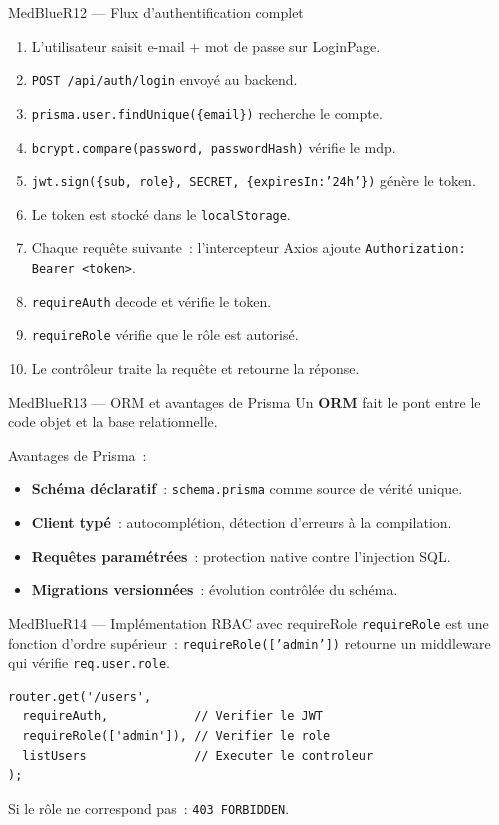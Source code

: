 \documentclass[12pt,a4paper,oneside]{report}
\begin{document}
\begin{qbox}{MedBlue}{R12 --- Flux d'authentification complet}
\begin{enumerate}
  \item L'utilisateur saisit e-mail + mot de passe sur LoginPage.
  \item \texttt{POST /api/auth/login} envoyé au backend.
  \item \texttt{prisma.user.findUnique(\{email\})} recherche le compte.
  \item \texttt{bcrypt.compare(password, passwordHash)} vérifie le mdp.
  \item \texttt{jwt.sign(\{sub, role\}, SECRET, \{expiresIn:'24h'\})}
        génère le token.
  \item Le token est stocké dans le \texttt{localStorage}.
  \item Chaque requête suivante~: l'intercepteur Axios ajoute
        \texttt{Authorization: Bearer <token>}.
  \item \texttt{requireAuth} decode et vérifie le token.
  \item \texttt{requireRole} vérifie que le rôle est autorisé.
  \item Le contrôleur traite la requête et retourne la réponse.
\end{enumerate}
\end{qbox}

\begin{qbox}{MedBlue}{R13 --- ORM et avantages de Prisma}
Un \textbf{ORM} fait le pont entre le code objet et la base relationnelle.

Avantages de Prisma~:
\begin{itemize}
  \item \textbf{Schéma déclaratif}~: \texttt{schema.prisma} comme
        source de vérité unique.
  \item \textbf{Client typé}~: autocomplétion, détection d'erreurs à la
        compilation.
  \item \textbf{Requêtes paramétrées}~: protection native contre
        l'injection SQL.
  \item \textbf{Migrations versionnées}~: évolution contrôlée du schéma.
\end{itemize}
\end{qbox}

\begin{qbox}{MedBlue}{R14 --- Implémentation RBAC avec requireRole}
\texttt{requireRole} est une fonction d'ordre supérieur~:
\texttt{requireRole(['admin'])} retourne un middleware qui vérifie
\texttt{req.user.role}.

\begin{lstlisting}
router.get('/users',
  requireAuth,            // Verifier le JWT
  requireRole(['admin']), // Verifier le role
  listUsers               // Executer le controleur
);
\end{lstlisting}
Si le rôle ne correspond pas~: \texttt{403 FORBIDDEN}.
\end{qbox}
\end{document}
